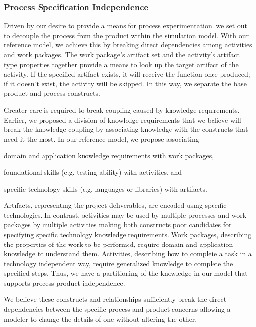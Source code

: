 \subsubsection{Process Specification Independence}
Driven by our desire to provide a means for process experimentation, we set
out to decouple the process from the product within the simulation
model.  With our reference model, we achieve this by breaking direct
dependencies among activities and work packages.  The work package's artifact set and the
activity's artifact type properties together provide a means to look up the
target artifact of the activity.  If the specified artifact exists, it will
receive the function once produced; if it doesn't exist, the activity will be
skipped.  In this way, we separate the base product and process constructs.

Greater care is required to break coupling caused by knowledge requirements. 
Earlier, we proposed a division of knowledge requirements that we believe will
break the knowledge coupling by associating knowledge with the constructs that
need it the most.  In our reference model, we propose associating
\begin{inparaenum}[(1)]
    \item domain and application knowledge requirements with work
        packages,
    \item foundational skills (e.g. testing ability) with
        activities, and
    \item specific technology skills (e.g. languages or libraries) with
        artifacts.
\end{inparaenum}
Artifacts, representing the project deliverables, are encoded using specific
technologies.  In contrast, activities may be used by multiple processes and
work packages by multiple activities making both constructs poor candidates for
specifying specific technology knowledge requirements.  Work packages,
describing the properties of the work to be performed, require domain and
application knowledge to understand them.  Activities, describing how to
complete a task in a technology independent way, require generalized knowledge
to complete the specified steps.  Thus, we have a partitioning of the knowledge 
in our model that supports process-product independence.

We believe these constructs and relationships sufficiently break the direct
dependencies between the specific process and product concerns allowing a
modeler to change the details of one without altering the other.
